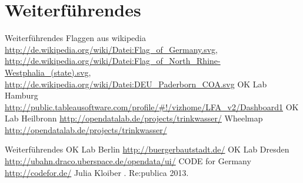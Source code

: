 \section{Weiterführendes}
  \begin{thebibliography}{10}
  \begin{frame}[t]{Weiterführendes}   
    Flaggen aus wikipedia
     \newblock {}
     \newblock \url{http://de.wikipedia.org/wiki/Datei:Flag_of_Germany.svg}, \url{http://de.wikipedia.org/wiki/Datei:Flag_of_North_Rhine-Westphalia_(state).svg}, \url{http://de.wikipedia.org/wiki/Datei:DEU_Paderborn_COA.svg}
    OK Lab Hamburg
    \newblock \url{http://public.tableausoftware.com/profile/\#!/vizhome/LFA_v2/Dashboard1} 
    OK Lab Heilbronn
    \newblock \url{http://opendatalab.de/projects/trinkwasser/}
    Wheelmap
    \newblock \url{http://opendatalab.de/projects/trinkwasser/}
   
\end{frame}


\begin{frame}[t]{Weiterführendes}   
    OK Lab Berlin
    \newblock \url{http://buergerbautstadt.de/}  
    OK Lab Dresden
    \newblock \url{http://ubahn.draco.uberspace.de/opendata/ui/}
    CODE for Germany
    \newblock \url{http://codefor.de/}
    Julia Kloiber
    .
    \newblock Re:publica 2013.
\end{frame}

  \end{thebibliography}